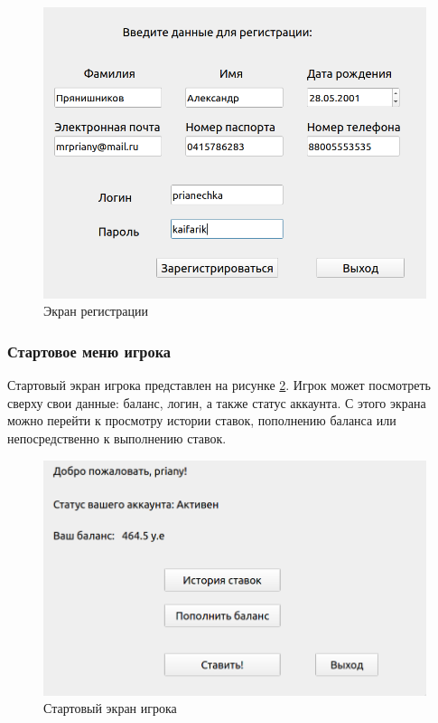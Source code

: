 \FloatBarrier
\begin{figure}[hp]	
	\begin{center}
		\includegraphics[width=\linewidth]{inc/registrate.png}
	\end{center}
	\caption{Экран регистрации}
	\label{fig::reg}
\end{figure}
\FloatBarrier

\newpage
\subsubsection{Стартовое меню игрока}
Стартовый экран игрока представлен на рисунке \ref{fig::user}. 
Игрок может посмотреть сверху свои данные: баланс, логин, а также статус аккаунта.
С этого экрана можно перейти к просмотру истории ставок, пополнению баланса или непосредственно к выполнению ставок.

\FloatBarrier
\begin{figure}[h]	
	\begin{center}
		\includegraphics[width=\linewidth]{inc/user.png}
	\end{center}
	\caption{Стартовый экран игрока}
	\label{fig::user}
\end{figure}
\FloatBarrier

